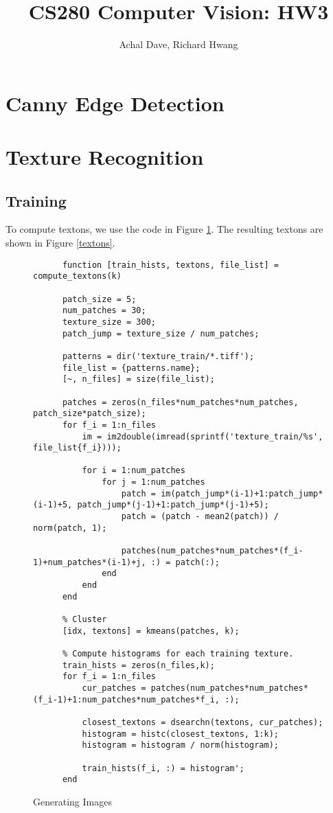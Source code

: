 \documentclass[11pt]{article}
\begin{document}
\title{CS280 Computer Vision: HW3}
\author{Achal Dave, Richard Hwang}
\maketitle

\section{Canny Edge Detection}

\section{Texture Recognition}
\subsection{Training}
To compute textons, we use the code in Figure \ref{texton_train}. The resulting
textons are shown in Figure \ref{textons}.

\begin{figure}[h!]
  \caption{Generating Images}
  \label{texton_train}
  \centering
    \begin{lstlisting}
      function [train_hists, textons, file_list] = compute_textons(k)

      patch_size = 5;
      num_patches = 30;
      texture_size = 300;
      patch_jump = texture_size / num_patches;

      patterns = dir('texture_train/*.tiff');
      file_list = {patterns.name};
      [~, n_files] = size(file_list);

      patches = zeros(n_files*num_patches*num_patches, patch_size*patch_size);
      for f_i = 1:n_files
          im = im2double(imread(sprintf('texture_train/%s', file_list{f_i})));

          for i = 1:num_patches
              for j = 1:num_patches
                  patch = im(patch_jump*(i-1)+1:patch_jump*(i-1)+5, patch_jump*(j-1)+1:patch_jump*(j-1)+5);
                  patch = (patch - mean2(patch)) / norm(patch, 1);

                  patches(num_patches*num_patches*(f_i-1)+num_patches*(i-1)+j, :) = patch(:);
              end
          end
      end

      % Cluster
      [idx, textons] = kmeans(patches, k);

      % Compute histograms for each training texture.
      train_hists = zeros(n_files,k);
      for f_i = 1:n_files
          cur_patches = patches(num_patches*num_patches*(f_i-1)+1:num_patches*num_patches*f_i, :);

          closest_textons = dsearchn(textons, cur_patches);
          histogram = histc(closest_textons, 1:k);
          histogram = histogram / norm(histogram);

          train_hists(f_i, :) = histogram';
      end
    \end{lstlisting}
\end{figure}
\end{document}
